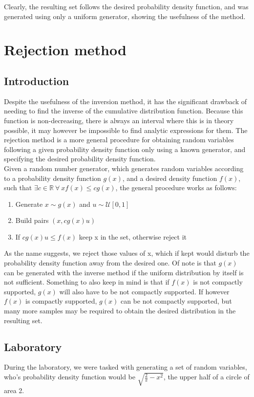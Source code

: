 Clearly, the resulting set follows the desired probability density function, and was generated using only a uniform generator, showing the usefulness of the method.

\clearpage

\chapter{Rejection method}
\section{Introduction}
Despite the usefulness of the inversion method, it has the significant drawback of needing to find the inverse of the cumulative distribution function. Because this function is non-decreasing, there is always an interval where this is in theory possible, it may however be impossible to find analytic expressions for them. The rejection method is a more general procedure for obtaining random variables following a given probability density function only using a known generator, and specifying the desired probability density function.\\
Given a random number generator, which generates random variables according to a probability density function $g(x)$, and a desired density function $f(x)$, such that $ \exists c  \in \mathbb{R}\: \forall \:x f(x) \le cg(x)$, the general procedure works as follows:
\begin{enumerate}
    \item Generate $x \sim g(x)$ and  $u \sim \mathcal{U}[0,1]$
    \item  Build pairs $(x,cg(x)u)$
    \item If $cg(x)u \le f(x)$ keep x in the set, otherwise reject it
\end{enumerate}
As the name suggests, we reject those values of x, which if kept would disturb the probability density function away from the desired one. Of note is that  $g(x)$ can be generated with the inverse method if the uniform distribution by itself is not sufficient. Something to also keep in mind is that if $f(x)$ is not compactly supported,  $g(x)$ will also have to be not compactly supported. If however  $f(x)$ is compactly supported,  $g(x)$ can be not compactly supported, but many more samples may be required to obtain the desired distribution in the resulting set.
\section{Laboratory}
During the laboratory, we were tasked with generating a set of random variables, who's probability density function would be $\sqrt{\frac{2}{\pi}-x^2}$, the upper half of a circle of area 2.
